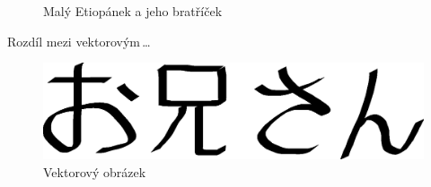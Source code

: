 \documentclass[a4paper,11pt,final]{article}
\begin{document}
\begin{figure}[h]
	\caption{Malý Etiopánek a jeho bratříček}
	\label{etiop}
\end{figure}

\newpage

Rozdíl mezi vektorovým\,\ldots

\begin{figure}[h]
	\centering
	\includegraphics[scale=0.4]{oniisan}
	\caption{Vektorový obrázek}
	\label{vect}
\end{figure}
\end{document}
